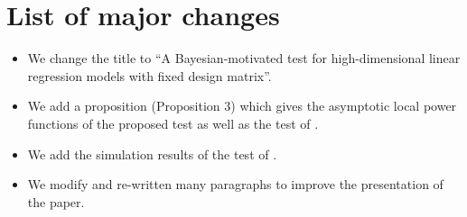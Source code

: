 \documentclass[11pt]{article}
\theoremstyle{plain}
\theoremstyle{definition}
\theoremstyle{remark}
\begin{document}
\section{List of major changes}
\begin{itemize}
    \item 
 We change the title to ``A Bayesian-motivated test for high-dimensional linear regression models with fixed design matrix''.
    \item
        We add a proposition (Proposition 3) which gives the asymptotic local power functions of the proposed test as well as the test of \cite{Goeman2006}.
    \item
        We add the simulation results of the test of \cite{zhang2016simultaneous}.
    \item
We modify and re-written many paragraphs to improve the presentation of the paper.
\end{itemize}








\end{document}
